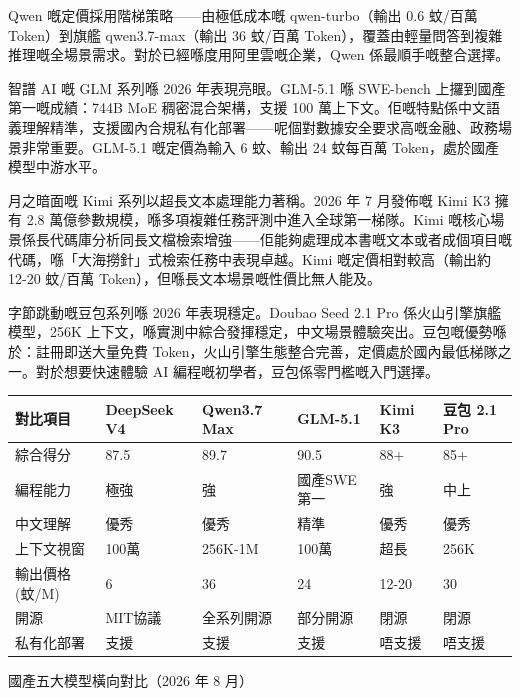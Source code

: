 Qwen 嘅定價採用階梯策略——由極低成本嘅 qwen-turbo（輸出 0.6 蚊/百萬 Token）到旗艦 qwen3.7-max（輸出 36 蚊/百萬 Token），覆蓋由輕量問答到複雜推理嘅全場景需求。對於已經喺度用阿里雲嘅企業，Qwen 係最順手嘅整合選擇。


智譜 AI 嘅 GLM 系列喺 2026 年表現亮眼。GLM-5.1 喺 SWE-bench 上攞到國產第一嘅成績：744B MoE 稠密混合架構，支援 100 萬上下文。佢嘅特點係中文語義理解精準，支援國內合規私有化部署——呢個對數據安全要求高嘅金融、政務場景非常重要。GLM-5.1 嘅定價為輸入 6 蚊、輸出 24 蚊每百萬 Token，處於國產模型中游水平。


月之暗面嘅 Kimi 系列以超長文本處理能力著稱。2026 年 7 月發佈嘅 Kimi K3 擁有 2.8 萬億參數規模，喺多項複雜任務評測中進入全球第一梯隊。Kimi 嘅核心場景係長代碼庫分析同長文檔檢索增強——佢能夠處理成本書嘅文本或者成個項目嘅代碼，喺「大海撈針」式檢索任務中表現卓越。Kimi 嘅定價相對較高（輸出約 12-20 蚊/百萬 Token），但喺長文本場景嘅性價比無人能及。


字節跳動嘅豆包系列喺 2026 年表現穩定。Doubao Seed 2.1 Pro 係火山引擎旗艦模型，256K 上下文，喺實測中綜合發揮穩定，中文場景體驗突出。豆包嘅優勢喺於：註冊即送大量免費 Token，火山引擎生態整合完善，定價處於國內最低梯隊之一。對於想要快速體驗 AI 編程嘅初學者，豆包係零門檻嘅入門選擇。

\begin{center}
\begin{tabularx}{\linewidth}{|X|X|X|X|X|X|}
\hline
\textbf{對比項目} & \textbf{DeepSeek V4} & \textbf{Qwen3.7 Max} & \textbf{GLM-5.1} & \textbf{Kimi K3} & \textbf{豆包 2.1 Pro} \tabularnewline
\hline
綜合得分 & 87.5 & 89.7 & 90.5 & 88+ & 85+ \tabularnewline
編程能力 & 極強 & 強 & 國產SWE第一 & 強 & 中上 \tabularnewline
中文理解 & 優秀 & 優秀 & 精準 & 優秀 & 優秀 \tabularnewline
上下文視窗 & 100萬 & 256K-1M & 100萬 & 超長 & 256K \tabularnewline
輸出價格(蚊/M) & 6 & 36 & 24 & 12-20 & 30 \tabularnewline
開源 & MIT協議 & 全系列開源 & 部分開源 & 閉源 & 閉源 \tabularnewline
私有化部署 & 支援 & 支援 & 支援 & 唔支援 & 唔支援 \tabularnewline
\hline
\end{tabularx}
\end{center}

\begin{center}\small\color{gray}國產五大模型橫向對比（2026 年 8 月）\end{center}


